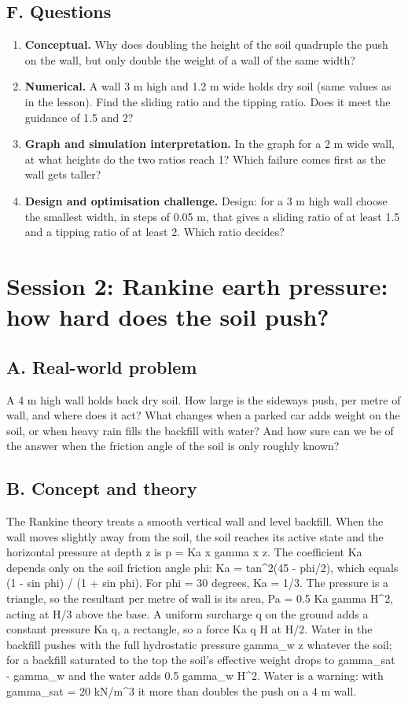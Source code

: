 \documentclass[11pt,a4paper]{article}
\begin{document}
\subsection*{F. Questions}
\begin{enumerate}[nosep]
\item \textbf{Conceptual.} Why does doubling the height of the soil quadruple the push on the wall, but only double the weight of a wall of the same width?
\item \textbf{Numerical.} A wall 3 m high and 1.2 m wide holds dry soil (same values as in the lesson). Find the sliding ratio and the tipping ratio. Does it meet the guidance of 1.5 and 2?
\item \textbf{Graph and simulation interpretation.} In the graph for a 2 m wide wall, at what heights do the two ratios reach 1? Which failure comes first as the wall gets taller?
\item \textbf{Design and optimisation challenge.} Design: for a 3 m high wall choose the smallest width, in steps of 0.05 m, that gives a sliding ratio of at least 1.5 and a tipping ratio of at least 2. Which ratio decides?
\end{enumerate}

\section{Session 2: Rankine earth pressure: how hard does the soil push?}

\subsection*{A. Real-world problem}
A 4 m high wall holds back dry soil. How large is the sideways push, per metre of wall, and where does it act? What changes when a parked car adds weight on the soil, or when heavy rain fills the backfill with water? And how sure can we be of the answer when the friction angle of the soil is only roughly known?

\subsection*{B. Concept and theory}
The Rankine theory treats a smooth vertical wall and level backfill. When the wall moves slightly away from the soil, the soil reaches its active state and the horizontal pressure at depth z is p = Ka x gamma x z. The coefficient Ka depends only on the soil friction angle phi: Ka = tan\textasciicircum{}2(45 - phi/2), which equals (1 - sin phi) / (1 + sin phi). For phi = 30 degrees, Ka = 1/3. The pressure is a triangle, so the resultant per metre of wall is its area, Pa = 0.5 Ka gamma H\textasciicircum{}2, acting at H/3 above the base. A uniform surcharge q on the ground adds a constant pressure Ka q, a rectangle, so a force Ka q H at H/2. Water in the backfill pushes with the full hydrostatic pressure gamma\_w z whatever the soil; for a backfill saturated to the top the soil's effective weight drops to gamma\_sat - gamma\_w and the water adds 0.5 gamma\_w H\textasciicircum{}2. Water is a warning: with gamma\_sat = 20 kN/m\textasciicircum{}3 it more than doubles the push on a 4 m wall.
\end{document}
